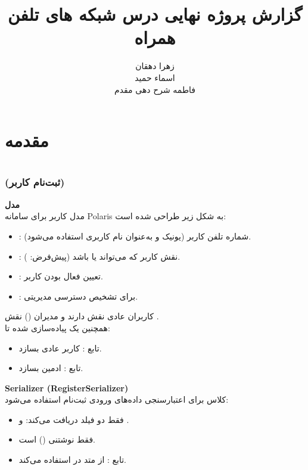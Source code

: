 \documentclass{report}
\title{گزارش پروژه نهایی درس شبکه های تلفن همراه}
\author{زهرا دهقان\\اسماء حمید\\فاطمه شرح دهی مقدم}
\begin{document}
\Godpage
\maketitle
{}
\tableofcontents


\chapter{مقدمه}






\chapter{ }

\section{}

\subsection{ (ثبت‌نام کاربر)}
\textbf{مدل } \\
مدل کاربر برای سامانه Polaris به شکل زیر طراحی شده است:

\begin{itemize}
  \item {}: شماره تلفن کاربر (یونیک و به‌عنوان نام کاربری استفاده می‌شود).
  \item {}: نقش کاربر که می‌تواند  یا  باشد (پیش‌فرض: ).
  \item {}: تعیین فعال بودن کاربر.
  \item {}: برای تشخیص دسترسی مدیریتی.
\end{itemize}

کاربران عادی نقش  دارند و مدیران () نقش . \\
همچنین یک  پیاده‌سازی شده تا:
\begin{itemize}
  \item تابع : کاربر عادی بسازد.
  \item تابع : ادمین بسازد.
\end{itemize}




\textbf{Serializer (RegisterSerializer)} \\
کلاس  برای اعتبارسنجی داده‌های ورودی ثبت‌نام استفاده می‌شود:
\begin{itemize}
  \item فقط دو فیلد دریافت می‌کند:  و .
  \item {} فقط نوشتنی () است.
  \item تابع : از متد  در  استفاده می‌کند.
\end{itemize}
\end{document}
